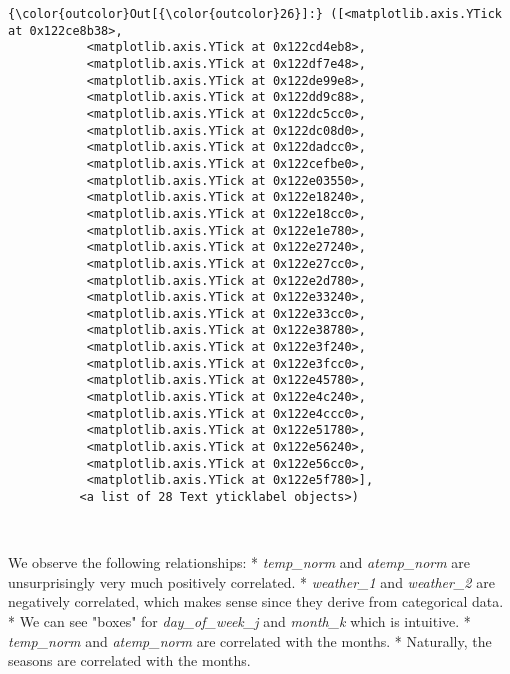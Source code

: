 \documentclass[11pt]{article}
\begin{document}
\begin{Verbatim}[commandchars=\\\{\}]
{\color{outcolor}Out[{\color{outcolor}26}]:} ([<matplotlib.axis.YTick at 0x122ce8b38>,
           <matplotlib.axis.YTick at 0x122cd4eb8>,
           <matplotlib.axis.YTick at 0x122df7e48>,
           <matplotlib.axis.YTick at 0x122de99e8>,
           <matplotlib.axis.YTick at 0x122dd9c88>,
           <matplotlib.axis.YTick at 0x122dc5cc0>,
           <matplotlib.axis.YTick at 0x122dc08d0>,
           <matplotlib.axis.YTick at 0x122dadcc0>,
           <matplotlib.axis.YTick at 0x122cefbe0>,
           <matplotlib.axis.YTick at 0x122e03550>,
           <matplotlib.axis.YTick at 0x122e18240>,
           <matplotlib.axis.YTick at 0x122e18cc0>,
           <matplotlib.axis.YTick at 0x122e1e780>,
           <matplotlib.axis.YTick at 0x122e27240>,
           <matplotlib.axis.YTick at 0x122e27cc0>,
           <matplotlib.axis.YTick at 0x122e2d780>,
           <matplotlib.axis.YTick at 0x122e33240>,
           <matplotlib.axis.YTick at 0x122e33cc0>,
           <matplotlib.axis.YTick at 0x122e38780>,
           <matplotlib.axis.YTick at 0x122e3f240>,
           <matplotlib.axis.YTick at 0x122e3fcc0>,
           <matplotlib.axis.YTick at 0x122e45780>,
           <matplotlib.axis.YTick at 0x122e4c240>,
           <matplotlib.axis.YTick at 0x122e4ccc0>,
           <matplotlib.axis.YTick at 0x122e51780>,
           <matplotlib.axis.YTick at 0x122e56240>,
           <matplotlib.axis.YTick at 0x122e56cc0>,
           <matplotlib.axis.YTick at 0x122e5f780>],
          <a list of 28 Text yticklabel objects>)
\end{Verbatim}
            
    \begin{center}
    \end{center}
    { \hspace*{\fill} \\}
    
    We observe the following relationships: * \emph{temp\_norm} and
\emph{atemp\_norm} are unsurprisingly very much positively correlated. *
\emph{weather\_1} and \emph{weather\_2} are negatively correlated, which
makes sense since they derive from categorical data. * We can see
"boxes" for \emph{day\_of\_week\_j} and \emph{month\_k} which is
intuitive. * \emph{temp\_norm} and \emph{atemp\_norm} are correlated
with the months. * Naturally, the seasons are correlated with the
months.
\end{document}
